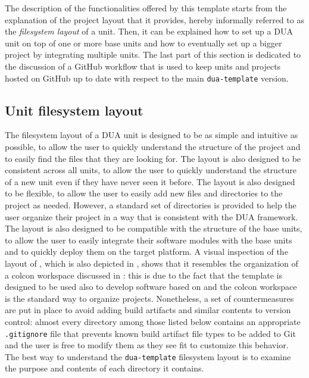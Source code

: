 The description of the functionalities offered by this template starts from the explanation of the project layout that it provides, hereby informally referred to as the \emph{filesystem layout} of a unit. Then, it can be explained how to set up a DUA unit on top of one or more base units and how to eventually set up a bigger project by integrating multiple units. The last part of this section is dedicated to the discussion of a GitHub workflow that is used to keep units and projects hosted on GitHub up to date with respect to the main \texttt{dua-template} version.

\subsection{Unit filesystem layout}
\label{sec:dua_template_layout}
The filesystem layout of a DUA unit is designed to be as simple and intuitive as possible, to allow the user to quickly understand the structure of the project and to easily find the files that they are looking for. The layout is also designed to be consistent across all units, to allow the user to quickly understand the structure of a new unit even if they have never seen it before. The layout is also designed to be flexible, to allow the user to easily add new files and directories to the project as needed. However, a standard set of directories is provided to help the user organize their project in a way that is consistent with the DUA framework. The layout is also designed to be compatible with the structure of the base units, to allow the user to easily integrate their software modules with the base units and to quickly deploy them on the target platform. A visual inspection of the layout of \cite{masocco_dua-template_nodate}, which is also depicted in , shows that it resembles the organization of a colcon workspace discussed in : this is due to the fact that the template is designed to be used also to develop software based on \ROS and the colcon workspace is the standard way to organize \ROS projects. Nonetheless, a set of countermeasures are put in place to avoid adding build artifacts and similar contents to version control: almost every directory among those listed below contains an appropriate \texttt{.gitignore} file that prevents known build artifact file types to be added to Git and the user is free to modify them as they see fit to customize this behavior. The best way to understand the \texttt{dua-template} filesystem layout is to examine the purpose and contents of each directory it contains.

